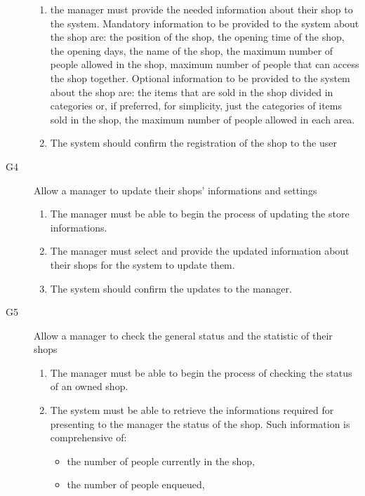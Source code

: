 \begin{description}
\begin{enumerate}[resume*]
            \item the manager must provide the needed information about their shop to the system.\newline
            Mandatory information to be provided to the system about the shop are: \newline
            the position of the shop,
            the opening time of the shop,
            the opening days, 
            the name of the shop,
            the maximum number of people allowed in the shop,
            maximum number of people that can access the shop together.
            Optional information to be provided to the system about the shop are:
            the items that are sold in the shop divided in categories or, if preferred, for simplicity, just the categories of items sold in the shop,
            the maximum number of people allowed in each area.
            \item The system should confirm the registration of the shop to the user
        \end{enumerate}
    \item [G4] Allow a manager to update their shops’ informations and settings
        \begin{enumerate}[resume*]
            \item The manager must be able to begin the process of updating the store informations.
            \item The manager must select and provide the updated information about their shops for the system to update them. 
            \item The system should confirm the updates to the manager. 
        \end{enumerate}
    \item [G5] Allow a manager to check the general status and the statistic of their shops
        \begin{enumerate}[resume*]
            \item The manager must be able to begin the process of checking the status of an owned shop.
            \item The system must be able to retrieve the informations required for presenting to the manager the status of the shop.\newline
            Such information is comprehensive of:
            \begin{itemize}[topsep=0pt]
                \item the number of people currently in the shop,
                \item the number of people enqueued, 

\end{itemize}
\end{enumerate}
\end{description}
